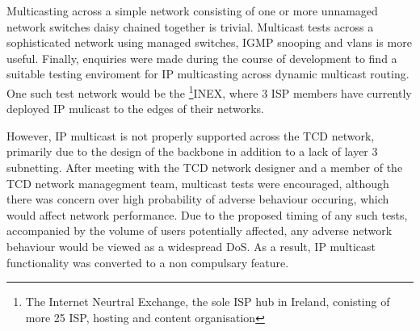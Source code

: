 Multicasting across a simple network consisting of one or 
more unnamaged network switches daisy chained together is trivial. 
Multicast tests across a sophisticated network using managed
switches, IGMP snooping and vlans is more useful. Finally, enquiries
were made during the course of development to find a suitable testing
enviroment for IP multicasting across dynamic multicast routing. One
such test network would be the \footnote{The Internet Neurtral
Exchange, the sole ISP hub in Ireland, conisting of more
25 ISP, hosting and content organisation}{INEX}, where 3 ISP members 
have currently deployed IP mulicast to the edges of their networks.

However, IP multicast is not properly supported across the 
TCD network, primarily due to the design of the backbone in addition 
to a lack of layer 3 subnetting. After meeting with the TCD network 
designer and a member of the TCD network managegment team, multicast 
tests were encouraged, although there was concern over high 
probability of adverse behaviour occuring, which would affect network 
performance. Due to the proposed timing of any such tests, 
accompanied by the volume of users potentially affected, any adverse 
network behaviour would be viewed as a widespread DoS. As a result,
IP multicast functionality was converted to a non compulsary feature.

